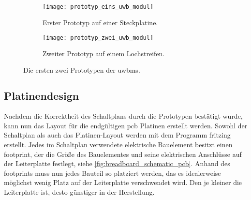 \begin{figure}
	\begin{subfigure}[t]{0.4\textwidth}
		\texttt{[image: prototyp\_eins\_uwb\_modul]}
		\caption{Erster Prototyp auf einer Steckplatine.}
		\label{fig:prototyp_eins_uwb_modul}
	\end{subfigure}
	\hfill
	\begin{subfigure}[t]{0.4\textwidth}
		\texttt{[image: prototyp\_zwei\_uwb\_modul]}
		\caption{Zweiter Prototyp auf einem Lochstreifen.}
		\label{fig:prototyp_zwei_uwb_modul}
	\end{subfigure}
	\caption{Die ersten zwei Prototypen der \glspl{uwbm}.}
	\label{fig:prototypen_der_uwb_module}
\end{figure}


%
%
\subsection{Platinendesign}

Nachdem die Korrektheit des Schaltplans durch die Prototypen bestätigt wurde, kann nun das Layout für die endgültigen \Gls{pcb} Platinen erstellt werden. Sowohl der Schaltplan als auch das Platinen-Layout werden mit dem Programm fritzing \cite{fritzing} erstellt. Jedes im Schaltplan verwendete elektrische Bauelement besitzt einen \Gls{footprint}, der die Größe des Bauelementes und seine elektrischen Anschlüsse auf der Leiterplatte festlegt, siehe \autoref{fig:breadboard_schematic_pcb}. Anhand des \Glspl{footprint} muss nun jedes Bauteil so platziert werden, das es idealerweise möglichst wenig Platz auf der Leiterplatte verschwendet wird. Den je kleiner die Leiterplatte ist, desto günstiger in der Herstellung.

